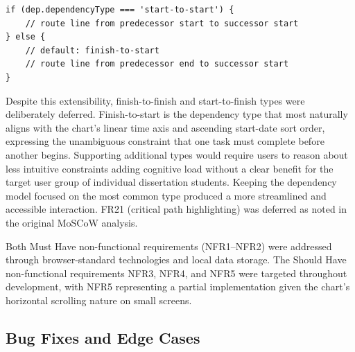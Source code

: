 \documentclass[12pt,nonacm,acmlarge,titlepage,screen]{acmart}
\begin{document}
\begin{lstlisting}[style=jsstyle, caption={Dependency type branching in \texttt{\#updateDependencyLines} (gantt-chart.js)}]
if (dep.dependencyType === 'start-to-start') {
    // route line from predecessor start to successor start
} else {
    // default: finish-to-start
    // route line from predecessor end to successor start
}
\end{lstlisting}

Despite this extensibility, finish-to-finish and start-to-finish types were deliberately
deferred. Finish-to-start is the dependency type that most naturally aligns with the chart's
linear time axis and ascending start-date sort order, expressing the unambiguous constraint
that one task must complete before another begins. Supporting additional types would require
users to reason about less intuitive constraints adding cognitive load without a clear benefit 
for the target user group of individual dissertation students. Keeping the dependency model 
focused on the most common type produced a more streamlined and accessible interaction. FR21
(critical path highlighting) was deferred as noted in the original MoSCoW analysis.

Both Must Have non-functional requirements (NFR1--NFR2) were addressed through
browser-standard technologies and local data storage. The Should Have non-functional
requirements NFR3, NFR4, and NFR5 were targeted throughout development, with NFR5
representing a partial implementation given the chart's horizontal scrolling nature on small
screens.

\subsection{Bug Fixes and Edge Cases}
\label{sec:impl_bugs}
\end{document}
